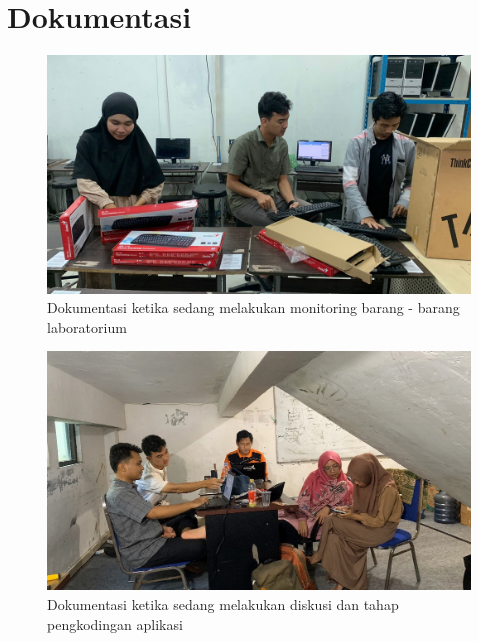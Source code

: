 %


%


\renewcommand{\thepage}{C - \arabic{page}}
\chapter{Dokumentasi}
\begin{figure}
	\centering
	\includegraphics[width=1\linewidth]{konten//gambar/Dokumentasi KP 1.jpg}
	\caption{Dokumentasi ketika sedang melakukan monitoring barang - barang laboratorium}
	\label{fig:enter-label}
\end{figure}
\begin{figure}
	\centering
	\includegraphics[width=1\linewidth]{konten//gambar/Dokumentasi KP 2.jpg}
	\caption{Dokumentasi ketika sedang melakukan diskusi dan tahap pengkodingan aplikasi}
	\label{fig:enter-label}
\end{figure}
